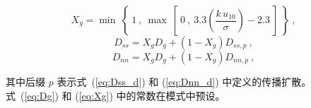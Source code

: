 
\begin{equation}
X_g = \min \: \left \{ \: 1 \: , \: \max \: \left [ \: 0 \: , \:
3.3 \left ( \frac{k \, u_{10}}{\sigma} \right ) - 2.3
\: \right ] \: \right \}
 \: , \label{eq:Xg} \end{equation} \begin{equation}
D_{ss} = X_g D_g + (1-X_g) D_{ss,p}
\: , \label{eq:Dss_f} \end{equation} \begin{equation}
D_{nn} = X_g D_g + (1-X_g) D_{nn,p}
\: , \label{eq:Dnn_f} \end{equation}

\noindent
其中后缀 $p$ 表示式~(\ref{eq:Dss_d}) 和 (\ref{eq:Dnn_d}) 中定义的传播扩散。式~(\ref{eq:Dg}) 和 (\ref{eq:Xg}) 中的常数在模式中预设。

